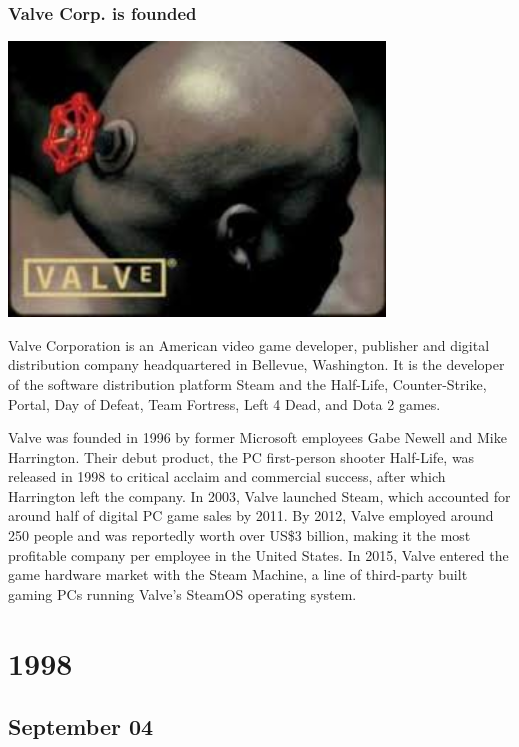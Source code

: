 \documentclass[11pt]{report}
\begin{document}
\subsection{Valve Corp. is founded}
\vspace{2mm}\begin{center}\includegraphics[width=10cm]{./img/valve.jpg}\end{center}
Valve Corporation is an American video game developer, publisher and digital distribution company headquartered in Bellevue, Washington. It is the developer of the software distribution platform Steam and the Half-Life, Counter-Strike, Portal, Day of Defeat, Team Fortress, Left 4 Dead, and Dota 2 games.

Valve was founded in 1996 by former Microsoft employees Gabe Newell and Mike Harrington. Their debut product, the PC first-person shooter Half-Life, was released in 1998 to critical acclaim and commercial success, after which Harrington left the company. In 2003, Valve launched Steam, which accounted for around half of digital PC game sales by 2011. By 2012, Valve employed around 250 people and was reportedly worth over US\$3 billion, making it the most profitable company per employee in the United States. In 2015, Valve entered the game hardware market with the Steam Machine, a line of third-party built gaming PCs running Valve's SteamOS operating system.

\chapter{1998}
\section{September 04}
\end{document}
